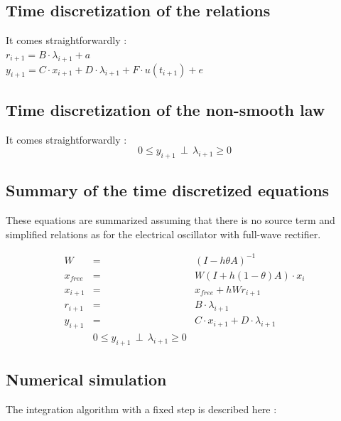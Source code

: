 \documentclass[10pt]{article}
\begin{document}
\subsection{Time discretization of the relations}
It comes straightforwardly :\\

$r_{i+1} = B \cdot \lambda_{i+1} + a$\\

$y_{i+1} = C \cdot x_{i+1} + D \cdot \lambda_{i+1} + F \cdot u(t_{i+1}) + e$\\


\subsection{Time discretization of the non-smooth law}
It comes straightforwardly :
\[
0 \leq y_{i+1} \, \perp \, \lambda_{i+1} \geq 0
\]

\subsection{Summary of the time discretized equations}
These equations are summarized assuming that there is no source term and simplified relations as for the 
electrical oscillator with full-wave rectifier.

\begin{eqnarray*}
W & = & (I - h \theta A)^{-1} \\
x_{free} & = & W(I + h (1-\theta) A) \cdot x_{i} \\
x_{i+1} & = & x_{free} + h W r_{i+1} \\
r_{i+1} & = & B \cdot \lambda_{i+1}  \\
y_{i+1} & = & C \cdot x_{i+1} + D \cdot \lambda_{i+1}  \\
 & 0 \leq y_{i+1} \, \perp \, \lambda_{i+1} \geq 0 & 
\end{eqnarray*}

\subsection{Numerical simulation}
The integration algorithm with a fixed step is described here :
\end{document}
